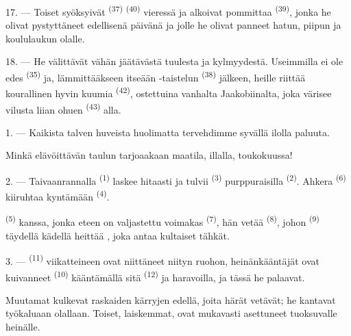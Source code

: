 17. --- Toiset syöksyivät  \textsuperscript{(37)}
 \textsuperscript{(40)} vieressä ja alkoivat pommittaa
 \textsuperscript{(39)}, jonka he olivat pystyttäneet edellisenä
päivänä ja jolle he olivat panneet hatun, piipun ja koululaukun olalle.

18. --- He välittävät vähän jäätävästä tuulesta ja kylmyydestä. Useimmilla ei ole
edes  \textsuperscript{(35)} ja, lämmittääkseen
itseään -taistelun \textsuperscript{(38)} jälkeen, heille
riittää kourallinen hyvin kuumia  \textsuperscript{(42)},
ostettuina vanhalta  Jaakobiinalta, joka värisee vilusta
liian ohuen  \textsuperscript{(43)} alla.

\VUsaut{3.0mm}
\VUsaut{3.0mm}

\VUsaut{4.0mm}

1. --- Kaikista talven huveista huolimatta tervehdimme syvällä ilolla
 paluuta.

Minkä elävöittävän taulun tarjoaakaan maatila, illalla, toukokuussa!

2. --- Taivaanrannalla  \textsuperscript{(1)} laskee hitaasti ja
tulvii  \textsuperscript{(3)} purppuraisilla
 \textsuperscript{(2)}. Ahkera 
\textsuperscript{(6)} kiiruhtaa kyntämään 
\textsuperscript{(4)}.

 \textsuperscript{(5)} kanssa, jonka eteen on valjastettu
voimakas  \textsuperscript{(7)}, hän vetää 
\textsuperscript{(8)}, johon  \textsuperscript{(9)} täydellä
kädellä heittää , joka antaa kultaiset tähkät.

3. ---  \textsuperscript{(11)} viikatteineen ovat niittäneet
niityn ruohon, heinänkääntäjät ovat kuivanneet 
\textsuperscript{(10)} kääntämällä sitä 
\textsuperscript{(12)} ja haravoilla, ja tässä he palaavat.

Muutamat kulkevat raskaiden kärryjen edellä, joita härät vetävät; he kantavat
työkaluaan olallaan. Toiset, laiskemmat, ovat mukavasti asettuneet tuoksuvalle
heinälle.


